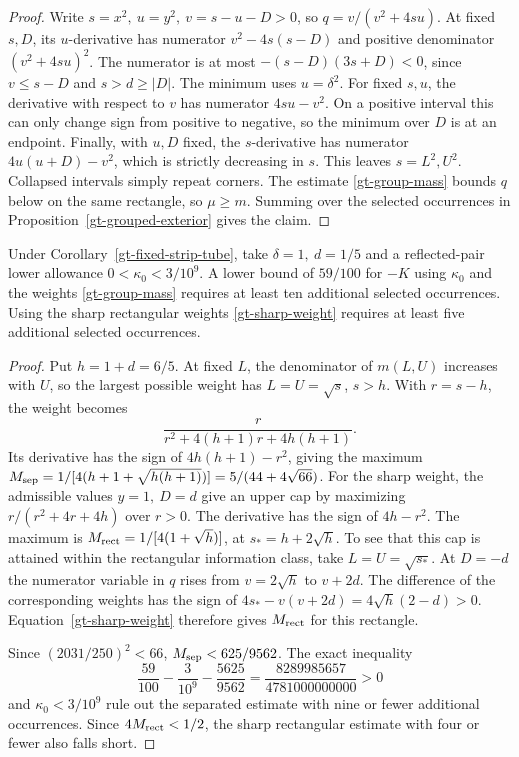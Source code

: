 \begin{proof}
Write \(s=x^2,\ u=y^2,\ v=s-u-D>0\), so \(q=v/(v^2+4su)\).
At fixed \(s,D\), its \(u\)-derivative has numerator
\(v^2-4s(s-D)\) and positive denominator \((v^2+4su)^2\).
The numerator is at most \(-(s-D)(3s+D)<0\), since
\(v\le s-D\) and \(s>d\ge |D|\). The minimum uses \(u=\delta^2\).
For fixed \(s,u\), the derivative with respect to \(v\) has numerator
\(4su-v^2\). On a positive interval this can only change sign from
positive to negative, so the minimum over \(D\) is at an endpoint.
Finally, with \(u,D\) fixed, the \(s\)-derivative has numerator
\(4u(u+D)-v^2\), which is strictly decreasing in \(s\).
This leaves \(s=L^2,U^2\). Collapsed intervals simply repeat
corners. The estimate \eqref{gt-group-mass} bounds \(q\) below on the
same rectangle, so \(\mu\ge m\). Summing over the selected occurrences
in Proposition~\ref{gt-grouped-exterior} gives the claim.
\end{proof}

\begin{corollary}
\label{gt-rectangle-count}
Under Corollary~\ref{gt-fixed-strip-tube}, take \(\delta=1,\ d=1/5\)
and a reflected-pair lower allowance \(0<\kappa_0<3/10^9\).
A lower bound of \(59/100\) for \(-K\) using \(\kappa_0\) and the weights
\eqref{gt-group-mass} requires at least ten additional selected
occurrences. Using the sharp rectangular weights \eqref{gt-sharp-weight}
requires at least five additional selected occurrences.
\end{corollary}

\begin{proof}
Put \(h=1+d=6/5\). At fixed \(L\), the denominator of
\(m(L,U)\) increases with \(U\), so the largest possible weight has
\(L=U=\sqrt{s}\), \(s>h\). With \(r=s-h\), the weight becomes
\[
 \frac{r}{r^2+4(h+1)r+4h(h+1)}.
\]
Its derivative has the sign of \(4h(h+1)-r^2\), giving the maximum
\(M_{\rm sep}=1/[4(h+1+\sqrt{h(h+1)})]=5/(44+4\sqrt{66})\).
For the sharp weight, the admissible values \(y=1,\ D=d\) give an
upper cap by maximizing \(r/(r^2+4r+4h)\) over \(r>0\).
The derivative has the sign of \(4h-r^2\). The maximum is
\(M_{\rm rect}=1/[4(1+\sqrt h)]\), at \(s_*=h+2\sqrt h\).
To see that this cap is attained within the rectangular information
class, take \(L=U=\sqrt{s_*}\). At \(D=-d\) the numerator variable
in \(q\) rises from \(v=2\sqrt h\) to \(v+2d\). The difference
of the corresponding weights has the sign of
\(4s_*-v(v+2d)=4\sqrt h(2-d)>0\).
Equation~\eqref{gt-sharp-weight} therefore gives \(M_{\rm rect}\)
for this rectangle.

Since \((2031/250)^2<66\), \(M_{\rm sep}<625/9562\).
The exact inequality
\[
 \frac{59}{100}-\frac{3}{10^9}-\frac{5625}{9562}
 =\frac{8289985657}{4781000000000}>0
\]
and \(\kappa_0<3/10^9\) rule out the separated estimate with nine
or fewer additional occurrences. Since \(4M_{\rm rect}<1/2\), the
sharp rectangular estimate with four or fewer also falls short.
\end{proof}

